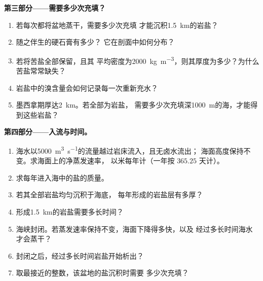 \begin{problem}
\noindent\textbf{第三部分——需要多少次充填？}
\begin{enumerate}[resume]
  \item 若每次都将盆地蒸干，需要多少次充填
        才能沉积\qty{1.5}{km}的岩盐？
  \item 随之伴生的硬石膏有多少？
        它在剖面中如何分布？
  \item 若将苦盐全部保留，且其
        平均密度为\qty{2000}{kg.m^{-3}}，则其厚度为多少？为什么苦盐常常缺失？
  \item 岩盐中的溴含量会如何记录每一次重新充水？
  \item 墨西拿期厚达\qty{2}{km}。若全部为岩盐，
        需要多少次充填深\qty{1000}{m}的海，才能得到这些岩盐？
\end{enumerate}

\noindent\textbf{第四部分——入流与时间。}
\begin{enumerate}[resume]
  \item 海水以\qty{5000}{m^3.s^{-1}}的流量越过岩床流入，且无卤水流出；
        海面高度保持不变。求海面上的净蒸发速率，
        以米每年计（一年按 $365.25$ 天计）。
  \item 求每年进入海中的盐的质量。
  \item 若其全部岩盐均匀沉积于海底，
        每年形成的岩盐层有多厚？
  \item 形成\qty{1.5}{km}的岩盐需要多长时间？
  \item 海峡封闭。若蒸发速率保持不变，海面下降得多快，以及
        经过多长时间海水才会蒸干？
  \item 封闭之后，经过多长时间岩盐开始析出？
  \item 取最接近的整数，该盆地的盐沉积时需要
        多少次充填？
\end{enumerate}
\end{problem}
